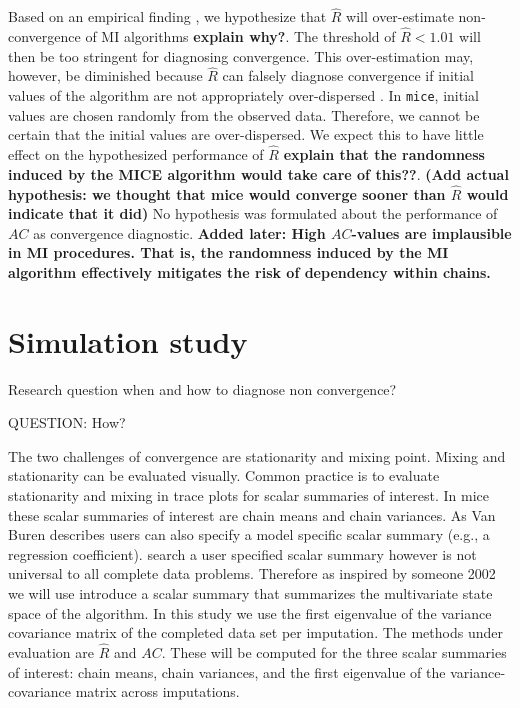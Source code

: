 \documentclass[Royal,times,sageh]{sagej}
\begin{document}
Based on an empirical finding \citep{lace07}, we hypothesize that
\(\widehat{R}\) will over-estimate non-convergence of MI algorithms
\textbf{explain why?}. The threshold of \(\widehat{R} < 1.01\) will then
be too stringent for diagnosing convergence. This over-estimation may,
however, be diminished because \(\widehat{R}\) can falsely diagnose
convergence if initial values of the algorithm are not appropriately
over-dispersed \citep[p.~437]{broo98}. In \texttt{mice}, initial values
are chosen randomly from the observed data. Therefore, we cannot be
certain that the initial values are over-dispersed. We expect this to
have little effect on the hypothesized performance of \(\widehat{R}\)
\textbf{explain that the randomness induced by the MICE algorithm would
take care of this??}. \textbf{(Add actual hypothesis: we thought that
mice would converge sooner than \(\widehat{R}\) would indicate that it
did)} No hypothesis was formulated about the performance of \(AC\) as
convergence diagnostic. \textbf{Added later: High \(AC\)-values are
implausible in MI procedures. That is, the randomness induced by the MI
algorithm effectively mitigates the risk of dependency within chains.}

\hypertarget{simulation-study}{%
\section{Simulation study}\label{simulation-study}}

Research question when and how to diagnose non convergence?

QUESTION: How?

The two challenges of convergence are stationarity and mixing point.
Mixing and stationarity can be evaluated visually. Common practice is to
evaluate stationarity and mixing in trace plots for scalar summaries of
interest. In mice these scalar summaries of interest are chain means and
chain variances. As Van Buren describes users can also specify a model
specific scalar summary (e.g., a regression coefficient). search a user
specified scalar summary however is not universal to all complete data
problems. Therefore as inspired by someone 2002 we will use introduce a
scalar summary that summarizes the multivariate state space of the
algorithm. In this study we use the first eigenvalue of the variance
covariance matrix of the completed data set per imputation. The methods
under evaluation are \(\widehat{R}\) and \(AC\). These will be computed
for the three scalar summaries of interest: chain means, chain
variances, and the first eigenvalue of the variance-covariance matrix
across imputations.
\end{document}
